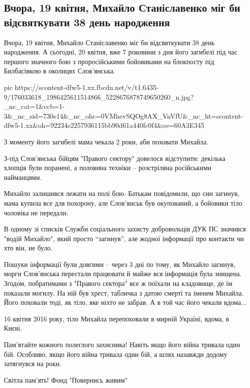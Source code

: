  
 
 
 
 

\subsection{Вчора, 19 квітня, Михайло Станіславенко міг би відсвяткувати 38 день народження}
\label{sec:19_04_2021.fb.backandalive.1.stanislavenko_mihail_smert_vojna}

Вчора, 19 квітня, Михайло Станіславенко міг би відсвяткувати 38 день
народження. А сьогодні, 20 квітня, вже 7 роковини з дня його загибелі під час
першого значного бою з проросійськими бойовиками на блокпосту під Билбасівкою в
околицях Слов'янська.

\ifcmt
  pic https://scontent-dfw5-1.xx.fbcdn.net/v/t1.6435-9/176033618_1986425611514866_5228676878749650260_n.jpg?_nc_cat=1&ccb=1-3&_nc_sid=730e14&_nc_ohc=0VMhevSQOg8AX_VnVfU&_nc_ht=scontent-dfw5-1.xx&oh=92234e2257936115bb90d61a440fc0f4&oe=60A3E345
\fi

З моменту його загибелі мама чекала 2 роки, аби поховати Михайла.

З-під Слов'янська бійцям "Правого сектору" довелося відступити: декілька
хлопців були поранені, а половина техніки – розстріляна російськими найманцями.

Михайло залишився лежати на полі бою. Батькам повідомили, що син загинув, мама
купила все для похорону, але Слов'янськ був окупований, а бойовики тіло
чоловіка не передали.

В одному зі списків Служби соціального захисту добровольців ДУК ПС значився
"водій Михайло", який просто “загинув”, але жодної інформації про контакти чи
хто він, не було.

Пошуки інформації були довгими – через 3 дні по тому, як Михайло загинув, морги
Слов'янська перестали працювати й майже вся інформація була знищена. Згодом,
побратимами з "Правого сектора" все ж поїхали на кладовище, де їм показали
могилу. На ній був хрест, табличка з датою смерті та іменем Михайла. Його
поховали тоді, як тіло, яке ніхто не забрав. А в той час його чекали вдома...

16 квітня 2016 року, тіло Михайла перепоховали в мирній Україні, вдома, в Києві.

Пам'ятайте кожного полеглого захисника! Навіть якщо його війна тривала один
бій. Особливо, якщо його війна тривала один бій, а шлях назавжди додому
затягнувся на роки.

Світла пам'ять!  Фонд "Повернись живим"
